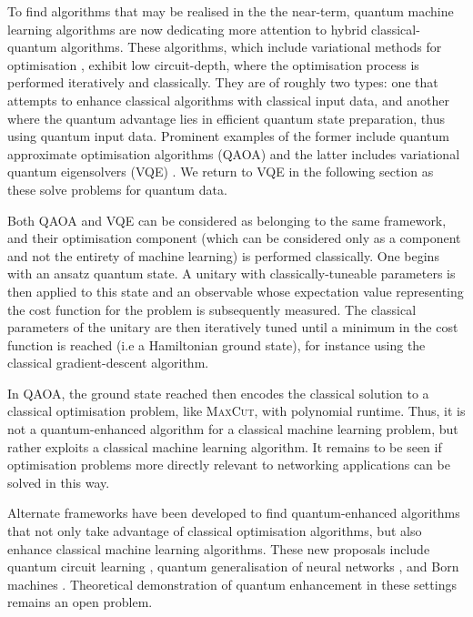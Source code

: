 \documentclass[twocolumn, aps, rmp, amsmath, amssymb, nofootinbib, superscriptaddress, longbibliography, floatfix, table-of-contents, eqsecnum]{revtex4}
\begin{document}
To find algorithms that may be realised in the the near-term, quantum machine learning algorithms are now dedicating more attention to hybrid classical-quantum algorithms. These algorithms, which include variational methods for optimisation \cite{bib:moll2018quantum}, exhibit low circuit-depth, where the optimisation process is performed iteratively and classically. They are of roughly two types: one that attempts to enhance classical algorithms with classical input data, and another where the quantum advantage lies in efficient quantum state preparation, thus using quantum input data. Prominent examples of the former include quantum approximate optimisation algorithms (QAOA) \cite{bib:farhi2014quantum, bib:farhi2016quantum} and the latter includes variational quantum eigensolvers (VQE) \cite{bib:peruzzo2014peruzzo, bib:kandala2017hardware}. We return to VQE in the following section as these solve problems for quantum data.

Both QAOA and VQE can be considered as belonging to the same framework, and their optimisation component (which can be considered only as a component and not the entirety of machine learning) is performed classically. One begins with an ansatz quantum state. A unitary with classically-tuneable parameters is then applied to this state and an observable whose expectation value representing the cost function for the problem is subsequently measured. The classical parameters of the unitary are then iteratively tuned until a minimum in the cost function is reached (i.e a Hamiltonian ground state), for instance using the classical gradient-descent algorithm.

In QAOA, the ground state reached then encodes the classical solution to a classical optimisation problem, like \textsc{MaxCut}, with polynomial runtime. Thus, it is not a quantum-enhanced algorithm for a classical machine learning problem, but rather exploits a classical machine learning algorithm. It remains to be seen if optimisation problems more directly relevant to networking applications can be solved in this way.

Alternate frameworks have been developed to find quantum-enhanced algorithms that not only take advantage of classical optimisation algorithms, but also enhance classical machine learning algorithms. These new proposals include quantum circuit learning \cite{bib:mitarai2018quantum}, quantum generalisation of neural networks \cite{wan2017quantum}, and Born machines \cite{bib:cheng2018information, bib:benedetti2018generative}. Theoretical demonstration of quantum enhancement in these settings remains an open problem.
\end{document}
